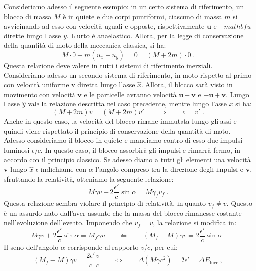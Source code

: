 Consideriamo adesso il seguente esempio: in un certo sistema di riferimento, un blocco di massa $M$ è in quiete e due corpi puntiformi, 
ciascuno di massa $m$ si avvicinando ad esso con velocità uguali e opposte, rispettivamente $\mathbf{u}$ e $-mathbf{u}$ dirette lungo l'asse $\hat{y}$. L'urto è anaelastico. Allora, per la legge di conservazione della quantità di moto della meccanica classica, si ha:
\begin{equation}
M\cdot 0+m(u_x+u_y)=0=(M+2m)\cdot 0\;.
\end{equation}
Questa relazione deve valere in tutti i sistemi di riferimento inerziali. Consideriamo adesso un secondo sistema di riferimento, in moto 
rispetto al primo con velocità uniforme $\mathbf{v}$ diretta lungo l'asse $\hat{x}$. Allora, il blocco sarà visto in movimento con velocità 
$\mathbf{v}$ e le particelle avranno velocità $\mathbf{u}+\mathbf{v}$ e $-\mathbf{u}+\mathbf{v}$. Lungo l'asse $\hat{y}$ vale la relazione descritta nel caso precedente, mentre lungo l'asse $\hat{x}$ si ha:
\begin{equation}
(M+2m)v=(M+2m)v'\qquad \Longrightarrow\qquad v=v'\;.
\end{equation}
Anche in questo caso, la velocità del blocco rimane immutata lungo gli assi e quindi viene rispettato il principio di conservazione della
 quantità di moto. Adesso consideriamo il blocco in quiete e mandiamo contro di esso due impulsi luminosi $\epsilon/c$. In questo caso, il blocco assorbirà gli impulsi e rimarrà fermo, in accordo con il principio classico. Se adesso diamo a tutti gli elementi una velocità $\mathbf{v}$ lungo $\hat{x}$ e indichiamo con $\alpha$ l'angolo compreso tra la direzione degli impulsi e $\mathbf{v}$, sfruttando la relatività, otteniamo la seguente relazione:
 \begin{equation}
 M\gamma v+2\frac{\epsilon'}{c}\sin\alpha=M\gamma_fv_f\;.
 \end{equation}
Questa relazione sembra violare il principio di relatività, in quanto $v_f\ne v$. Questo è un assurdo nato dall'aver assunto che la massa
 del blocco rimanesse costante nell'evoluzione dell'evento. Imponendo che $v_f=v$, la relazione si modifica in:
 \begin{equation}
 M\gamma v+2\frac{\epsilon'}{c}\sin\alpha=M_f\gamma v\qquad \Longleftrightarrow\qquad (M_f-M)\gamma v=2\frac{\epsilon'}{c}\sin\alpha\;.
 \end{equation}
Il seno dell'angolo $\alpha$ corrisponde al rapporto $v/c$, per cui:
\begin{equation}
(M_f-M)\gamma v=\frac{2\epsilon'}{c}\frac{v}{c}\qquad \Longleftrightarrow\qquad \Delta(M\gamma c^2)=2\epsilon'=\Delta E_{\mathrm{luce}}\;,
\end{equation}

